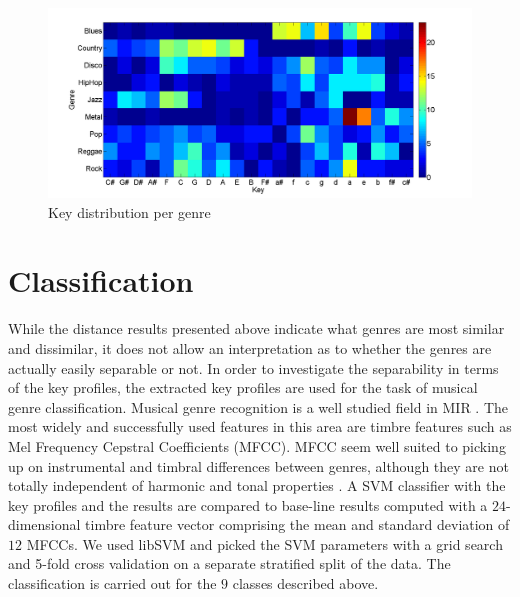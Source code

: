\documentclass{article}
\begin{document}
\begin{figure}
    \includegraphics[scale=.2]{graph/key_distribution_colour_legend}
	\caption{Key distribution per genre}
	\label{fig:KeyDistributionPerGenre}
\end{figure}


\section{Classification}\label{sec:classification}
While the distance results presented above indicate what genres are most similar and dissimilar, it does not allow an interpretation as to whether the genres are actually easily separable or not. In order to investigate the separability in terms of the key profiles, the extracted key profiles are used for the task of musical genre classification. 
Musical genre recognition is a well studied field in MIR \cite{fu_survey_2011}. The most widely and successfully used features in this area are timbre features such as Mel Frequency Cepstral Coefficients (MFCC). MFCC seem well suited to picking up on instrumental and timbral differences between genres, although they are not totally independent of harmonic and tonal properties \cite{li_genre_2011}.
A SVM classifier with the key profiles and the results are compared to base-line results computed with a $24$-dimensional timbre feature vector comprising the mean and standard deviation of $12$ MFCCs. %
We used libSVM  \cite{chang_libsvm:_2011} and picked the SVM parameters with a grid search and 5-fold cross validation on a separate stratified split of the data. The classification is carried out for the $9$ classes described above.
\end{document}
